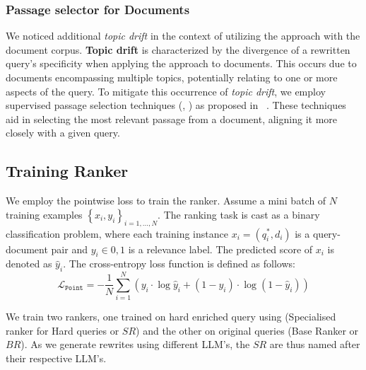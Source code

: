\subsubsection{Passage selector for Documents}
\label{method:attention_linear}
We noticed additional \textit{topic drift} in the context of utilizing the \car{} approach with the document corpus. \textbf{Topic drift} is characterized by the divergence of a rewritten query's specificity when applying the \car{} approach to documents. This occurs due to documents encompassing multiple topics, potentially relating to one or more aspects of the query. To mitigate this occurrence of \textit{topic drift}, we employ supervised passage selection techniques (\attention{}, \linear{}) as proposed in ~\cite{leonhardt2021learnt}. These techniques aid in selecting the most relevant passage from a document, aligning it more closely with a given query.

\subsection{Training Ranker}
\label{method:ranker}

 We employ the pointwise loss to train the ranker. Assume a mini batch of $N$ training examples $\left\{x_i, y_i\right\}_{i=1, ..., N}$. The ranking task is cast as a binary classification problem, where each training instance $x_i = (q^*_i, d_i)$ is a query-document pair and $y_i \in {0, 1}$ is a relevance label. The predicted score of $x_i$ is denoted as $\hat{y}_i$. The cross-entropy loss function is defined as follows:
\begin{equation}
    \mathcal{L}_{\mathtt{Point}} = -\frac{1}{N} \sum_{i=1}^{N} \left( y_{i} \cdot \log \hat{y}_{i} + (1 - y_{i}) \cdot \log (1-\hat{y}_{i}) \right)
\end{equation}

We train two rankers, one trained on hard enriched query using \car{} (Specialised ranker for Hard queries or $SR$) and the other on original queries 
 (Base Ranker or $BR$). As we generate rewrites using different LLM's, the $SR$ are thus named after their respective LLM's.


